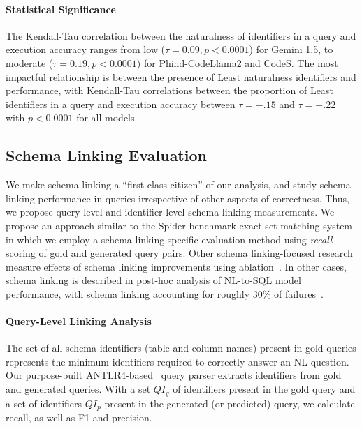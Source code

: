 \paragraph{\textbf{Statistical Significance}}
The Kendall-Tau correlation between the naturalness of identifiers in a query and execution accuracy ranges from low ($\tau = 0.09, p < 0.0001$) for Gemini 1.5, to moderate ($\tau = 0.19, p < 0.0001$) for Phind-CodeLlama2 and CodeS.
The most impactful relationship is between the presence of Least naturalness identifiers and performance, with Kendall-Tau correlations between the proportion of Least  identifiers in a query and execution accuracy between $\tau=-.15$ and $\tau=-.22$ with $p < 0.0001$ for all models.

\subsection{Schema Linking Evaluation}
\label{section:linking-evaluation}

We make schema linking a ``first class citizen'' of our analysis, and study schema linking performance in queries irrespective of other aspects of correctness. 
Thus, we propose query-level and identifier-level schema linking measurements.
We propose an approach similar to the Spider benchmark exact set matching system~\cite{Yu&al.18c} in which we employ a schema linking-specific evaluation method using \emph{recall} scoring of gold and generated query pairs.
Other schema linking-focused research measure effects of schema linking improvements using ablation~\cite{wang2020rat-sql, cao-etal-2021-lgesql, 10.1145/3534678.3539305, 49288}. 
In other cases, schema linking is described in post-hoc analysis of NL-to-SQL model performance, with schema linking accounting for roughly 30\% of failures~\cite{dong2023c3, pourreza2023dinsql}.

\paragraph{\textbf{Query-Level Linking Analysis}}
The set of all schema identifiers (table and column names) present in gold queries represents the minimum identifiers required to correctly answer an NL question.
Our purpose-built ANTLR4-based~\cite{Parr2014} query parser extracts identifiers from gold and generated queries.
With a set $QI_g$ of identifiers present in the gold query and a set of identifiers $QI_p$ present in the generated (or predicted) query, we calculate recall, as well as F1 and precision.

